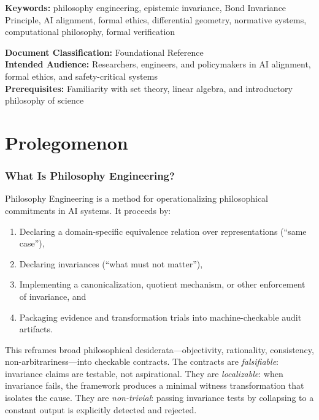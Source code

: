 \documentclass[12pt,letterpaper]{article}
\theoremstyle{definition}
\theoremstyle{plain}
\begin{document}
\noindent\textbf{Keywords:} philosophy engineering, epistemic invariance, Bond Invariance Principle, AI alignment, formal ethics, differential geometry, normative systems, computational philosophy, formal verification

\vfill
\noindent\textbf{Document Classification:} Foundational Reference\\
\textbf{Intended Audience:} Researchers, engineers, and policymakers in AI alignment, formal ethics, and safety-critical systems\\
\textbf{Prerequisites:} Familiarity with set theory, linear algebra, and introductory philosophy of science

\newpage
\tableofcontents
\newpage

\part{Prolegomenon}
\label{part:prolegomenon}

\section{What Is Philosophy Engineering?}
\label{sec:what-is-pe}

Philosophy Engineering is a method for operationalizing philosophical commitments in AI systems. It proceeds by:
\begin{enumerate}[label=(\roman*)]
    \item Declaring a domain-specific equivalence relation over representations (``same case''),
    \item Declaring invariances (``what must not matter''),
    \item Implementing a canonicalization, quotient mechanism, or other enforcement of invariance, and
    \item Packaging evidence and transformation trials into machine-checkable audit artifacts.
\end{enumerate}

This reframes broad philosophical desiderata---objectivity, rationality, consistency, non-arbitrariness---into checkable contracts. The contracts are \emph{falsifiable}: invariance claims are testable, not aspirational. They are \emph{localizable}: when invariance fails, the framework produces a minimal witness transformation that isolates the cause. They are \emph{non-trivial}: passing invariance tests by collapsing to a constant output is explicitly detected and rejected.
\end{document}
